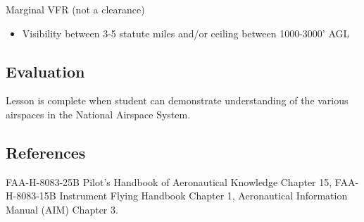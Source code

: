 Marginal VFR (not a clearance)
\begin{itemize}
  \item Visibility between 3-5 statute miles and/or ceiling between 1000-3000' AGL
\end{itemize}

\subsection{Evaluation}

Lesson is complete when student can demonstrate understanding of the various
airspaces in the National Airspace System.

\subsection{References}

FAA-H-8083-25B Pilot's Handbook of Aeronautical Knowledge Chapter 15,
FAA-H-8083-15B Instrument Flying Handbook Chapter 1, Aeronautical Information
Manual (AIM) Chapter 3.

